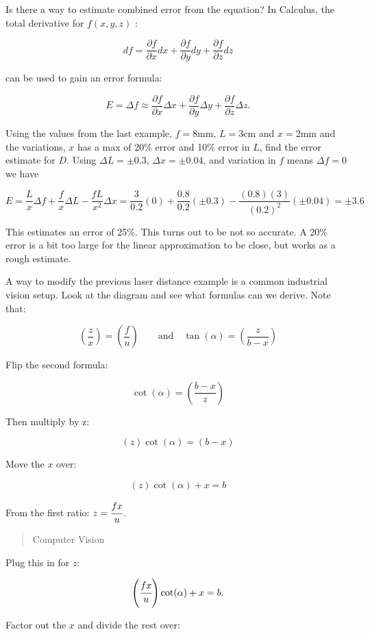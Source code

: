 Is there a way to estimate combined error from the equation? In
Calculus, the total derivative for \(f(x,y,z)\) :

\[df = \frac{\partial f}{\partial x}  dx + \frac{\partial f}{\partial y} dy + \frac{\partial f}{\partial z} dz\]

can be used to gain an error formula:

\[E = \Delta f \approx \frac{\partial f}{\partial x} \Delta x + \frac{\partial f}{\partial y} \Delta y + \frac{\partial f}{\partial z} \Delta z .\]

Using the values from the last example, \(f=8\)mm, \(L = 3\)cm and
\(x = 2\)mm and the variations, \(x\) has a max of 20\% error and 10\%
error in \(L\), find the error estimate for \(D\). Using
\(\Delta L = \pm 0.3\), \(\Delta x = \pm 0.04\), and variation in \(f\)
means \(\Delta f = 0\) we have

\[E  = \frac{L}{x} \Delta f +  \frac{f}{x} \Delta L - \frac{fL}{x^2} \Delta x
    = \frac{3}{0.2} (0) +  \frac{0.8}{0.2} (\pm 0.3) - \frac{(0.8)(3)}{(0.2)^2}(\pm 0.04)
    = \pm 3.6\]

This estimates an error of 25\%. This turns out to be not so accurate. A
20\% error is a bit too large for the linear approximation to be close,
but works as a rough estimate.

A way to modify the previous laser distance example is a common
industrial vision setup. Look at the diagram and see what formulas can
we derive. Note that:

\[\left(\frac{z}{x}\right) = \left(\frac{f}{u}\right) \qquad \mbox{and}\quad\tan(\alpha) = \left( \frac{z}{b-x} \right)\]

Flip the second formula:

\[\cot(\alpha) = \left(\frac{b-x}{z}\right)\]

Then multiply by z:

\[\left( z \right)\cot(\alpha) = \left( b-x \right)\]

Move the \(x\) over:

\[\left( z \right)\cot(\alpha) + x = b\]

From the first ratio: \(z = \cfrac{fx}{u}\).

\begin{quote}
Computer Vision
\end{quote}

Plug this in for \(z\):

\[\left(\cfrac{fx}{u}\right)\cot(\alpha) +x  = b.\]

Factor out the \(x\) and divide the rest over:

